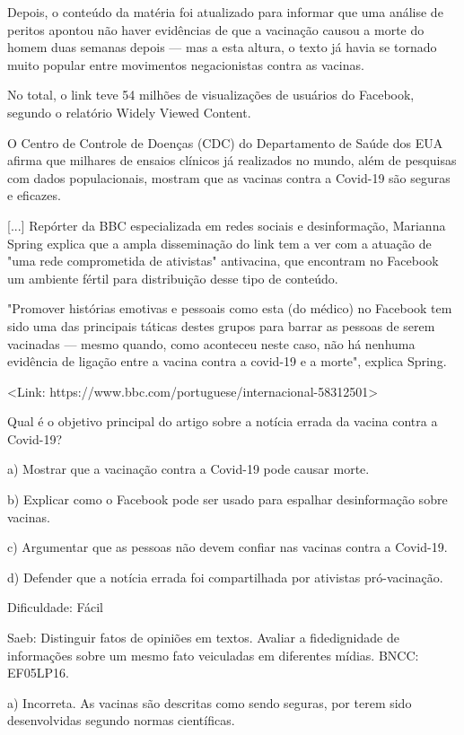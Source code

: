 Depois, o conteúdo da matéria foi atualizado para informar que uma
análise de peritos apontou não haver evidências de que a vacinação
causou a morte do homem duas semanas depois --- mas a esta altura, o
texto já havia se tornado muito popular entre movimentos negacionistas
contra as vacinas.

No total, o link teve 54 milhões de visualizações de usuários do
Facebook, segundo o relatório Widely Viewed Content.

O Centro de Controle de Doenças (CDC) do Departamento de Saúde dos EUA
afirma que milhares de ensaios clínicos já realizados no mundo, além de
pesquisas com dados populacionais, mostram que as vacinas contra a
Covid-19 são seguras e eficazes.

{[}...{]} Repórter da BBC especializada em redes sociais e
desinformação, Marianna Spring explica que a ampla disseminação do link
tem a ver com a atuação de "uma rede comprometida de ativistas"
antivacina, que encontram no Facebook um ambiente fértil para
distribuição desse tipo de conteúdo.

"Promover histórias emotivas e pessoais como esta (do médico) no
Facebook tem sido uma das principais táticas destes grupos para barrar
as pessoas de serem vacinadas --- mesmo quando, como aconteceu neste
caso, não há nenhuma evidência de ligação entre a vacina contra a
covid-19 e a morte", explica Spring.

\textless{}Link:
https://www.bbc.com/portuguese/internacional-58312501\textgreater{}

Qual é o objetivo principal do artigo sobre a notícia errada da vacina
contra a Covid-19?

a) Mostrar que a vacinação contra a Covid-19 pode causar morte.

b) Explicar como o Facebook pode ser usado para espalhar desinformação
sobre vacinas.

c) Argumentar que as pessoas não devem confiar nas vacinas contra a
Covid-19.

d) Defender que a notícia errada foi compartilhada por ativistas
pró-vacinação.

Dificuldade: Fácil

Saeb: Distinguir fatos de opiniões em textos. Avaliar a fidedignidade de
informações sobre um mesmo fato veiculadas em diferentes mídias. BNCC:
EF05LP16.

a) Incorreta. As vacinas são descritas como sendo seguras, por terem
sido desenvolvidas segundo normas científicas.

